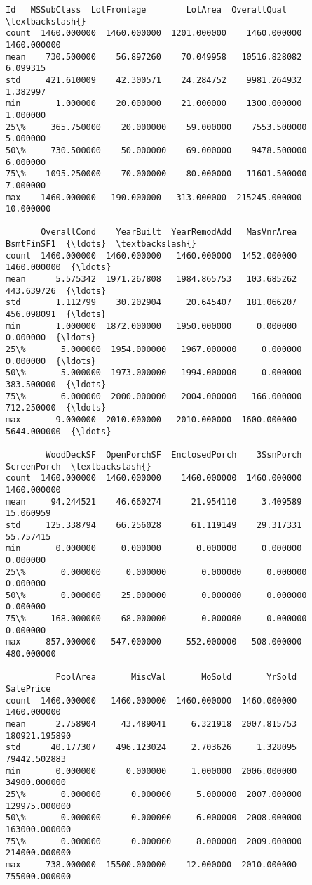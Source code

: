\documentclass[11pt]{article}
\makeatletter
\newcommand{\boxspacing}{\kern\kvtcb@left@rule\kern\kvtcb@boxsep}
\newcommand{\prompt}[4]{
        \ttfamily\llap{{\color{#2}[#3]:\hspace{3pt}#4}}\vspace{-\baselineskip}
    }
\makeatother
\begin{document}
            \begin{tcolorbox}[breakable, size=fbox, boxrule=.5pt, pad at break*=1mm, opacityfill=0]
\prompt{Out}{outcolor}{5}{\boxspacing}
\begin{Verbatim}[commandchars=\\\{\}]
                Id   MSSubClass  LotFrontage        LotArea  OverallQual  \textbackslash{}
count  1460.000000  1460.000000  1201.000000    1460.000000  1460.000000
mean    730.500000    56.897260    70.049958   10516.828082     6.099315
std     421.610009    42.300571    24.284752    9981.264932     1.382997
min       1.000000    20.000000    21.000000    1300.000000     1.000000
25\%     365.750000    20.000000    59.000000    7553.500000     5.000000
50\%     730.500000    50.000000    69.000000    9478.500000     6.000000
75\%    1095.250000    70.000000    80.000000   11601.500000     7.000000
max    1460.000000   190.000000   313.000000  215245.000000    10.000000

       OverallCond    YearBuilt  YearRemodAdd   MasVnrArea   BsmtFinSF1  {\ldots}  \textbackslash{}
count  1460.000000  1460.000000   1460.000000  1452.000000  1460.000000  {\ldots}
mean      5.575342  1971.267808   1984.865753   103.685262   443.639726  {\ldots}
std       1.112799    30.202904     20.645407   181.066207   456.098091  {\ldots}
min       1.000000  1872.000000   1950.000000     0.000000     0.000000  {\ldots}
25\%       5.000000  1954.000000   1967.000000     0.000000     0.000000  {\ldots}
50\%       5.000000  1973.000000   1994.000000     0.000000   383.500000  {\ldots}
75\%       6.000000  2000.000000   2004.000000   166.000000   712.250000  {\ldots}
max       9.000000  2010.000000   2010.000000  1600.000000  5644.000000  {\ldots}

        WoodDeckSF  OpenPorchSF  EnclosedPorch    3SsnPorch  ScreenPorch  \textbackslash{}
count  1460.000000  1460.000000    1460.000000  1460.000000  1460.000000
mean     94.244521    46.660274      21.954110     3.409589    15.060959
std     125.338794    66.256028      61.119149    29.317331    55.757415
min       0.000000     0.000000       0.000000     0.000000     0.000000
25\%       0.000000     0.000000       0.000000     0.000000     0.000000
50\%       0.000000    25.000000       0.000000     0.000000     0.000000
75\%     168.000000    68.000000       0.000000     0.000000     0.000000
max     857.000000   547.000000     552.000000   508.000000   480.000000

          PoolArea       MiscVal       MoSold       YrSold      SalePrice
count  1460.000000   1460.000000  1460.000000  1460.000000    1460.000000
mean      2.758904     43.489041     6.321918  2007.815753  180921.195890
std      40.177307    496.123024     2.703626     1.328095   79442.502883
min       0.000000      0.000000     1.000000  2006.000000   34900.000000
25\%       0.000000      0.000000     5.000000  2007.000000  129975.000000
50\%       0.000000      0.000000     6.000000  2008.000000  163000.000000
75\%       0.000000      0.000000     8.000000  2009.000000  214000.000000
max     738.000000  15500.000000    12.000000  2010.000000  755000.000000


\end{Verbatim}
\end{tcolorbox}
\end{document}
